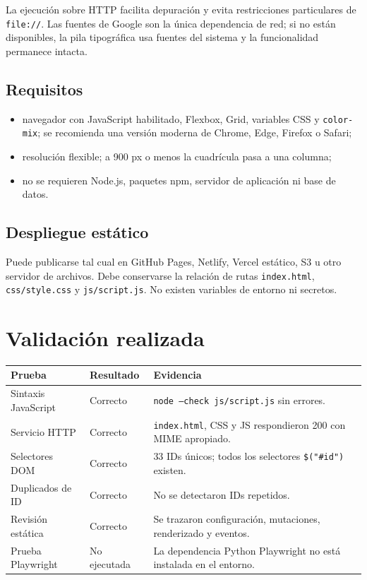 \documentclass[11pt,a4paper]{article}
\newcommand{\archivo}[1]{\texttt{#1}}
\begin{document}
La ejecución sobre HTTP facilita depuración y evita restricciones particulares de
\texttt{file://}. Las fuentes de Google son la única dependencia de red; si no
están disponibles, la pila tipográfica usa fuentes del sistema y la funcionalidad
permanece intacta.

\subsection{Requisitos}

\begin{itemize}
  \item navegador con JavaScript habilitado, Flexbox, Grid, variables CSS y
  \texttt{color-mix}; se recomienda una versión moderna de Chrome, Edge, Firefox o Safari;
  \item resolución flexible; a 900 px o menos la cuadrícula pasa a una columna;
  \item no se requieren Node.js, paquetes npm, servidor de aplicación ni base de datos.
\end{itemize}

\subsection{Despliegue estático}

Puede publicarse tal cual en GitHub Pages, Netlify, Vercel estático, S3 u otro
servidor de archivos. Debe conservarse la relación de rutas
\archivo{index.html}, \archivo{css/style.css} y \archivo{js/script.js}. No existen
variables de entorno ni secretos.

\section{Validación realizada}

\begin{longtable}{p{}p{}p{}}
\toprule
\textbf{Prueba} & \textbf{Resultado} & \textbf{Evidencia}\\
\midrule
\endhead
Sintaxis JavaScript & Correcto & \texttt{node --check js/script.js} sin errores.\\
Servicio HTTP & Correcto & \texttt{index.html}, CSS y JS respondieron 200 con MIME apropiado.\\
Selectores DOM & Correcto & 33 IDs únicos; todos los selectores \texttt{\$("\#id")} existen.\\
Duplicados de ID & Correcto & No se detectaron IDs repetidos.\\
Revisión estática & Correcto & Se trazaron configuración, mutaciones, renderizado y eventos.\\
Prueba Playwright & No ejecutada & La dependencia Python Playwright no está instalada en el entorno.\\
\bottomrule
\end{longtable}
\end{document}
